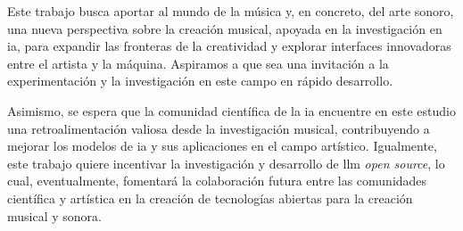 Este trabajo busca aportar al mundo de la música y, en concreto, del arte sonoro, una nueva perspectiva sobre la creación musical, apoyada en la investigación en \gls{ia}, para expandir las fronteras de la creatividad y explorar interfaces innovadoras entre el artista y la máquina. Aspiramos a que sea una invitación a la experimentación y la investigación en este campo en rápido desarrollo.

Asimismo, se espera que la comunidad científica de la \gls{ia} encuentre en este estudio una retroalimentación valiosa desde la investigación musical, contribuyendo a mejorar los modelos de \gls{ia} y sus aplicaciones en el campo artístico. Igualmente, este trabajo quiere incentivar la investigación y desarrollo de \gls{llm} \emph{open source}, lo cual, eventualmente, fomentará la colaboración futura entre las comunidades científica y artística en la creación de tecnologías abiertas para la creación musical y sonora.